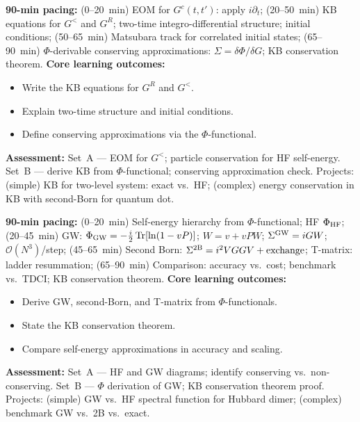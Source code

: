 \documentclass[11pt,a4paper]{article}
\begin{document}
\medskip

\begin{tcolorbox}[modulebox, title={Module~II.5 --- Lecture L05: Kadanoff--Baym Equations}]
\textbf{90-min pacing:} (0--20~min) EOM for $G^c(t,t')$: apply $i\partial_t$; (20--50~min) KB equations for $G^<$ and $G^R$; two-time integro-differential structure; initial conditions; (50--65~min) Matsubara track for correlated initial states; (65--90~min) $\Phi$-derivable conserving approximations: $\Sigma=\delta\Phi/\delta G$; KB conservation theorem.
\medskip\textbf{Core learning outcomes:}
\begin{itemize}[leftmargin=1.4em,topsep=2pt,itemsep=1pt]
  \item Write the KB equations for $G^R$ and $G^<$.
  \item Explain two-time structure and initial conditions.
  \item Define conserving approximations via the $\Phi$-functional.
\end{itemize}
\medskip\textbf{Assessment:}
Set~A --- EOM for $G^<$; particle conservation for HF self-energy.
Set~B --- derive KB from $\Phi$-functional; conserving approximation check.
Projects: (simple) KB for two-level system: exact vs.\ HF; (complex) energy conservation in KB with second-Born for quantum dot.
\end{tcolorbox}

\medskip

\begin{tcolorbox}[modulebox, title={Module~II.5 --- Lecture L06: Self-Energies and Conserving Approximations}]
\textbf{90-min pacing:} (0--20~min) Self-energy hierarchy from $\Phi$-functional; HF $\Phi_{\rm HF}$; (20--45~min) GW: $\Phi_{\rm GW}=-\tfrac{i}{2}\operatorname{Tr}[\ln(1-vP)]$; $W=v+vPW$; $\Sigma^{\rm GW}=iGW$; $\mathcal{O}(N^3)$/step; (45--65~min) Second Born: $\Sigma^{\rm 2B}=i^2VGGV+\text{exchange}$; T-matrix: ladder resummation; (65--90~min) Comparison: accuracy vs.\ cost; benchmark vs.\ TDCI; KB conservation theorem.
\medskip\textbf{Core learning outcomes:}
\begin{itemize}[leftmargin=1.4em,topsep=2pt,itemsep=1pt]
  \item Derive GW, second-Born, and T-matrix from $\Phi$-functionals.
  \item State the KB conservation theorem.
  \item Compare self-energy approximations in accuracy and scaling.
\end{itemize}
\medskip\textbf{Assessment:}
Set~A --- HF and GW diagrams; identify conserving vs.\ non-conserving.
Set~B --- $\Phi$ derivation of GW; KB conservation theorem proof.
Projects: (simple) GW vs.\ HF spectral function for Hubbard dimer; (complex) benchmark GW vs.\ 2B vs.\ exact.
\end{tcolorbox}
\end{document}
